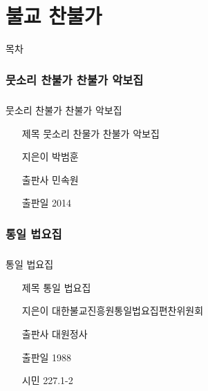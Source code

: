 \documentclass[aspectratio=1610,14pt,xcolor=pdftex,dvipsnames,table,handout]{beamer}
\begin{document}
		\part{ 불교 찬불가 }
		\frame{\partpage}

		\begin{frame} [plain]{목차}
		\tableofcontents%
		\end{frame}


		\section{ 뭇소리 찬불가 찬불가 악보집 }
		\begin{frame} [t,plain]
		\frametitle{}
			\begin{block} { 뭇소리 찬불가 찬불가 악보집 }
			\setlength{\leftmargini}{4em}			
			\begin{itemize}
				\item [제목]  	뭇소리 찬물가 찬불가 악보집 
				\item [지은이]	박범훈
				\item [출판사]	민속원
				\item [출판일]	2014
			\end{itemize}
			\end{block}						
		\end{frame}						



		\section{ 통일 법요집 }
		\begin{frame} [t,plain]
		\frametitle{}
			\begin{block} { 통일 법요집 }
			\setlength{\leftmargini}{4em}			
			\begin{itemize}
				\item [제목]  	통일 법요집
				\item [지은이]	대한불교진흥원통일법요집편찬위원회 
				\item [출판사]	대원정사
				\item [출판일]	1988
				\item [시민]		227.1-2	
			\end{itemize}
			\end{block}						
		\end{frame}						
\end{document}
